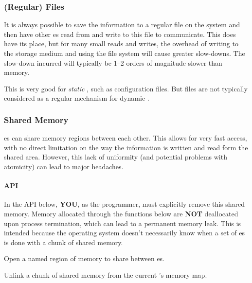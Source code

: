 \subsubsection{(Regular) Files}\label{subsubsec:IPC_Mechanism-Regular_Files}
It is always possible to save the information to a regular file on the system and then have other es read from and write to this file to communicate.
This does have its place, but for many small reads and writes, the overhead of writing to the storage medium and using the file system will cause greater slow-downs.
The slow-down incurred will typically be 1--2 orders of magnitude slower than memory.

This is very good for \textit{static} , such as configuration files.
But files are not typically considered as a regular mechanism for dynamic .

\subsubsection{Shared Memory}\label{subsubsec:IPC_Mechanism-Shared_Memory}
es can share memory regions between each other.
This allows for very fast access, with no direct limitation on the way the information is written and read form the shared area.
However, this lack of uniformity (and potential problems with atomicity) can lead to major headaches.

\paragraph{API}\label{par:Shared_Memory_API}
In the API below, \textbf{YOU}, as the programmer, must explicitly remove this shared memory.
Memory allocated through the functions below are \textbf{NOT} deallocated upon process termination, which can lead to a permanent memory leak.
This is intended because the operating system doesn't necessarily know when a set of es is done with a chunk of shared memory.

\begin{description}[noitemsep]
\item[\cinline{int shm_open(const char *name, int oflag, mode_t mode)}] Open a named region of memory to share between es.
\item[\cinline{int shm_unlink(const char *name)}] Unlink a chunk of shared memory from the current 's memory map.
\end{description}

